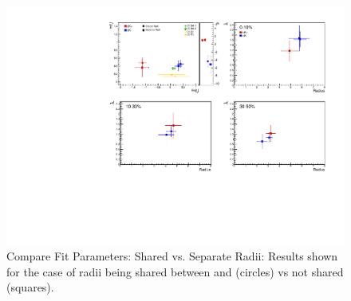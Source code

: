 \documentclass[/home/jesse/Analysis/FemtoAnalysis/AnalysisNotes/AnalysisNoteJBuxton.tex]{subfiles}
\begin{document}
\begin{figure}[h]
  \centering
  \includegraphics[width=\textwidth]{7_ResultsAndDiscussion/Figures/CompareAllScattParams_CompSharedvsSepR_StatOnly.pdf}
  \caption[Compare Fit Parameters: Shared vs. Separate Radii]{Compare Fit Parameters: Shared vs. Separate Radii:  Results shown for the case of radii being shared between \LamKchPALamKchM and \LamKchMALamKchP (circles) vs not shared (squares).}
  \label{fig:CompareAllScattParams_SharevsSepR}
\end{figure}



\clearpage
\end{document}
